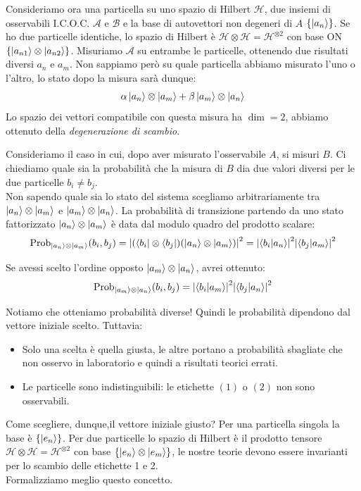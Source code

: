 


Consideriamo ora una particella su uno spazio di Hilbert \(\mathcal{H}\), due insiemi di osservabili I.C.O.C. \(\mathcal{A}\) e \(\mathcal{B}\) e la base di autovettori non degeneri di \(A\) \(\left\{ \ket{a_n} \right\}\).
Se ho due particelle identiche, lo spazio di Hilbert è \(\mathcal{H}\otimes\mathcal{H}= \mathcal{H}^{\otimes2}\) con base ON \(\left\{ \ket{a_{n1}}\otimes \ket{a_{n2}} \right\}\).
Misuriamo \(\mathcal{A}\) su entrambe le particelle, ottenendo due risultati diversi \(a_n\) e \(a_m\). Non sappiamo però su quale particella abbiamo misurato l'uno o l'altro, lo stato dopo la misura sarà dunque:
\[
    \alpha\ket{a_n}\otimes\ket{a_m} + \beta \ket{a_m}\otimes\ket{a_n}
\]
Lo spazio dei vettori compatibile con questa misura ha \(\dim =2\), abbiamo ottenuto della \textit{degenerazione di scambio}.



Consideriamo il caso in cui, dopo aver misurato l'osservabile \( A \), si misuri \( B \). Ci chiediamo quale sia la probabilità che la misura di \( B \) dia due valori diversi per le due particelle \( b_i \neq b_j \).\\
Non sapendo quale sia lo stato del sistema scegliamo arbitrariamente tra \(\ket{a_n}\otimes\ket{a_m} \) e \( \ket{a_m}\otimes\ket{a_n}\).
La probabilità di transizione partendo da uno stato fattorizzato \( \ket{a_n}\otimes\ket{a_m} \) è data dal modulo quadro del prodotto scalare:
\[
    \text{Prob}_{\ket{a_n}\otimes\ket{a_m}}(b_i, b_j) = \abs{(\bra{b_i}\otimes\bra{b_j})(\ket{a_n}\otimes\ket{a_m})}^2
    = \abs{\braket{b_i}{a_n}}^2 \abs{\braket{b_j}{a_m}}^2
\]

Se avessi scelto l'ordine opposto \( \ket{a_m}\otimes\ket{a_n} \), avrei ottenuto:
\[
    \text{Prob}_{\ket{a_m}\otimes\ket{a_n}}(b_i, b_j) = \abs{\braket{b_i}{a_m}}^2 \abs{\braket{b_j}{a_n}}^2
\]

Notiamo che otteniamo probabilità diverse! Quindi le probabilità dipendono dal vettore iniziale scelto. Tuttavia:
\begin{itemize}
    \item Solo una scelta è quella giusta, le altre portano a probabilità sbagliate che non osservo in laboratorio e quindi a risultati teorici errati.
    \item Le particelle sono indistinguibili: le etichette \( (1) \) o \( (2) \) non sono osservabili.
\end{itemize}
Come scegliere, dunque,il vettore iniziale giusto?
Per una particella singola la base è \( \{ \ket{e_n} \} \). Per due particelle lo spazio di Hilbert è il prodotto tensore \( \mathcal{H} \otimes \mathcal{H} = \mathcal{H}^{\otimes 2} \) 
con base \( \{ \ket{e_n}\otimes\ket{e_m} \} \), le nostre teorie devono essere invarianti per lo scambio delle etichette 1 e 2.\\
Formalizziamo meglio questo concetto.

